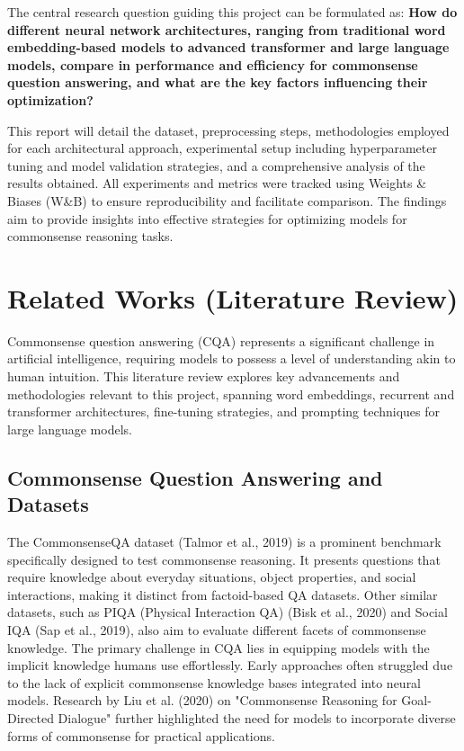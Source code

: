 \documentclass[10.5pt]{article}
\begin{document}
The central research question guiding this project can be formulated as: \textbf{How do different neural network architectures, ranging from traditional word embedding-based models to advanced transformer and large language models, compare in performance and efficiency for commonsense question answering, and what are the key factors influencing their optimization?}

This report will detail the dataset, preprocessing steps, methodologies employed for each architectural approach, experimental setup including hyperparameter tuning and model validation strategies, and a comprehensive analysis of the results obtained. All experiments and metrics were tracked using Weights \& Biases (W\&B) to ensure reproducibility and facilitate comparison. The findings aim to provide insights into effective strategies for optimizing models for commonsense reasoning tasks.

\section{Related Works (Literature Review)}
Commonsense question answering (CQA) represents a significant challenge in artificial intelligence, requiring models to possess a level of understanding akin to human intuition. This literature review explores key advancements and methodologies relevant to this project, spanning word embeddings, recurrent and transformer architectures, fine-tuning strategies, and prompting techniques for large language models.

\subsection{Commonsense Question Answering and Datasets}
The CommonsenseQA dataset (Talmor et al., 2019) is a prominent benchmark specifically designed to test commonsense reasoning. It presents questions that require knowledge about everyday situations, object properties, and social interactions, making it distinct from factoid-based QA datasets. Other similar datasets, such as PIQA (Physical Interaction QA) (Bisk et al., 2020) and Social IQA (Sap et al., 2019), also aim to evaluate different facets of commonsense knowledge. The primary challenge in CQA lies in equipping models with the implicit knowledge humans use effortlessly. Early approaches often struggled due to the lack of explicit commonsense knowledge bases integrated into neural models. Research by Liu et al. (2020) on "Commonsense Reasoning for Goal-Directed Dialogue" further highlighted the need for models to incorporate diverse forms of commonsense for practical applications.
\end{document}
